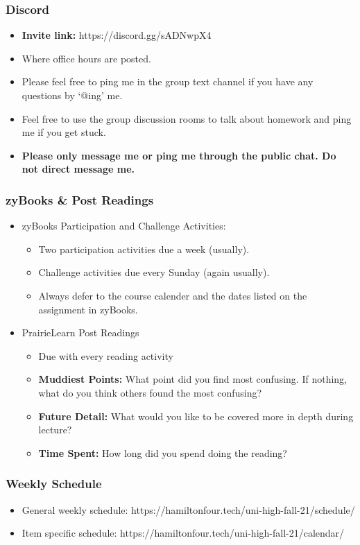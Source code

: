 \documentclass{beamer}
\begin{document}
\begin{frame}
  \frametitle{Discord}
  \begin{itemize}
    \item \textbf{Invite link:} https://discord.gg/sADNwpX4
    \item Where office hours are posted.
    \item Please feel free to ping me in the group text channel if you have any questions by `@ing' me.
    \item Feel free to use the group discussion rooms to talk about homework and ping me if you get stuck. 
    \item \textbf{Please only message me or ping me through the public chat. Do not direct message me.}
  \end{itemize}
\end{frame}

\begin{frame}
  \frametitle{zyBooks \& Post Readings}
  \begin{itemize}
    \item zyBooks Participation and Challenge Activities:
    \begin{itemize}
      \item Two participation activities due a week (usually).
      \item Challenge activities due every Sunday (again usually).
      \item Always defer to the course calender and the dates listed on the assignment in zyBooks.
    \end{itemize}
    \item PrairieLearn Post Readings
    \begin{itemize}
      \item Due with every reading activity
      \item \textbf{Muddiest Points: } What point did you find most confusing. If nothing, what do you think others found the most confusing?
      \item \textbf{Future Detail: } What would you like to be covered more in depth during lecture?
      \item \textbf{Time Spent: } How long did you spend doing the reading?
    \end{itemize}
  \end{itemize}
\end{frame}

\begin{frame}
  \frametitle{Weekly Schedule}
  \begin{itemize}
    \item General weekly schedule: https://hamiltonfour.tech/uni-high-fall-21/schedule/
    \item Item specific schedule: https://hamiltonfour.tech/uni-high-fall-21/calendar/
  \end{itemize}
\end{frame}
\end{document}
